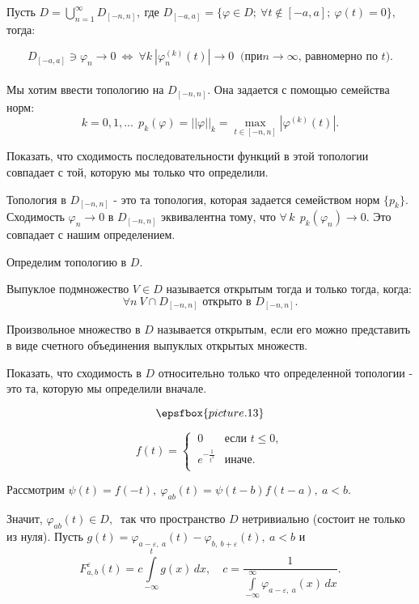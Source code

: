 \documentclass[a4paper]{article}
\newcommand{\nsb}{n\rightarrow \infty} %
\newcommand{\ff} {\varphi}
\begin{document}
Пусть $D = \bigcup \limits_{n=1}^{\infty} D_{[-n,n]}, \  \mbox{
где } D_{[-a,a]} = \{ \varphi \in D; \  \forall t \notin [-a,a];\
\varphi(t) =0 \},$ \\
тогда:

$$D_{[-a,a]} \ni \varphi_n \rightarrow 0 \ \Longleftrightarrow\
\forall k \ |\varphi_n^{(k)}(t)|\rightarrow 0 \ \mbox{ (при
$\nsb$, равномерно по $t$).} $$\\

Мы хотим ввести топологию на $D_{[-n,n]}$. Она задается с помощью
семейства норм: $$k=0,1,... \ \ p_k(\varphi) = ||\varphi||_k =\max
\limits_{t \in [-n,n]} |\varphi^{(k)}(t)|.$$
\begin{problem}
Показать, что сходимость последовательности функций в этой
топологии совпадает с той, которую мы только что определили.
\end{problem}



Топология в $D_{[-n,n]}$ - это та топология, которая задается
семейством норм $\{p_k \}$.\\
Сходимость $\varphi_n \rightarrow 0$ в $D_{[-n,n]}$ эквивалентна
тому, что $\forall\, k \ \ p_k(\varphi_n) \rightarrow 0 $. Это
совпадает с нашим определением.

Определим топологию в $D$.
\begin{df}
Выпуклое подмножество $V \in D$ называется открытым тогда и только
тогда, когда:
$$\forall n \ V\cap D_{[-n,n]} \mbox{ открыто в }
D_{[-n,n]}.$$
\end{df}

Произвольное множество в $D$ называется открытым, если его можно
представить в виде счетного объединения выпуклых открытых
множеств.

\begin{problem}
Показать, что сходимость в $D$ относительно только  что
определенной топологии - это та, которую мы определили вначале.
\end{problem}

\begin{ex}

$$\epsfbox{picture.13}$$

\[f(t) = \begin{cases}
 \ 0 & \text{если $t \leqslant 0 $},\\
 \ e^{-\frac{1}{t^2}}  & \text{иначе}.\\
   \end{cases} \]

Рассмотрим $\psi(t) = f(-t), \  \varphi_{ab}(t)
   = \psi(t-b) f(t-a), \ a < b.$

Значит, $\varphi_{ab}(t) \in D,\ $ так что пространство $D$
нетривиально (состоит не только из нуля). Пусть $g(t) = \ff_{a-
\varepsilon,\  a}(t) - \ff_{b, \ b +\varepsilon} (t), \ a < b$  и
$$
F_{a,b}^{\varepsilon}(t) = c \int \limits_{-\infty}^t g(x) \, dx,
\quad c=\frac{1}{\int \limits_{- \infty}^{\infty} \varphi_{a -
\varepsilon,\  a} (x) \, dx}.
$$

\end{ex}
\end{document}
